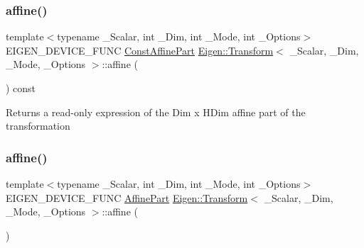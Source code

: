 \subsubsection{\texorpdfstring{affine()}{affine()}\hspace{0.1cm}{\footnotesize\ttfamily [1/2]}}
{\footnotesize\ttfamily template$<$typename \+\_\+\+Scalar, int \+\_\+\+Dim, int \+\_\+\+Mode, int \+\_\+\+Options$>$ \\
E\+I\+G\+E\+N\+\_\+\+D\+E\+V\+I\+C\+E\+\_\+\+F\+U\+NC \mbox{\hyperlink{class_eigen_1_1_transform_adfa0bf2d9504548cdc9b9051b2fa9673}{Const\+Affine\+Part}} \mbox{\hyperlink{class_eigen_1_1_transform}{Eigen\+::\+Transform}}$<$ \+\_\+\+Scalar, \+\_\+\+Dim, \+\_\+\+Mode, \+\_\+\+Options $>$\+::affine (\begin{DoxyParamCaption}{ }\end{DoxyParamCaption}) const\hspace{0.3cm}{\ttfamily [inline]}}

\begin{DoxyReturn}{Returns}
a read-\/only expression of the Dim x H\+Dim affine part of the transformation 
\end{DoxyReturn}
\mbox{\label{class_eigen_1_1_transform_a77b379a598ff0e570a8112db65111a94}} 
\subsubsection{\texorpdfstring{affine()}{affine()}\hspace{0.1cm}{\footnotesize\ttfamily [2/2]}}
{\footnotesize\ttfamily template$<$typename \+\_\+\+Scalar, int \+\_\+\+Dim, int \+\_\+\+Mode, int \+\_\+\+Options$>$ \\
E\+I\+G\+E\+N\+\_\+\+D\+E\+V\+I\+C\+E\+\_\+\+F\+U\+NC \mbox{\hyperlink{class_eigen_1_1_transform_a8319bad977b0dabf2dfaf2e2dc30f13e}{Affine\+Part}} \mbox{\hyperlink{class_eigen_1_1_transform}{Eigen\+::\+Transform}}$<$ \+\_\+\+Scalar, \+\_\+\+Dim, \+\_\+\+Mode, \+\_\+\+Options $>$\+::affine (\begin{DoxyParamCaption}{ }\end{DoxyParamCaption})\hspace{0.3cm}{\ttfamily [inline]}}

